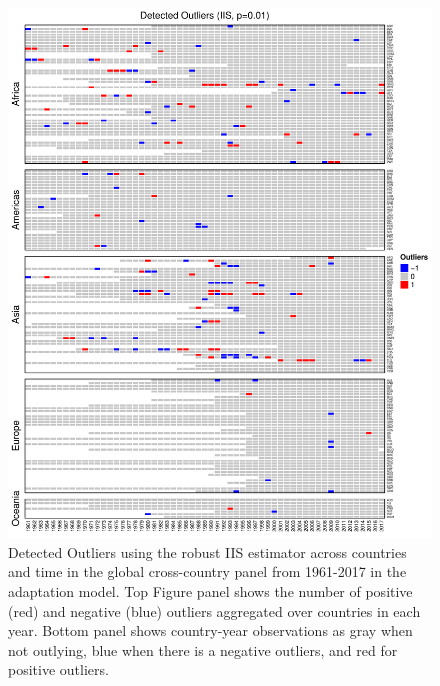 \documentclass[11pt, letterpaper]{article}
\numberwithin{algorithm}{section}
\numberwithin{assumption}{section}
\numberwithin{lemma}{section}
\numberwithin{theorem}{section}
\numberwithin{corollary}{section}
\numberwithin{remark}{section}
\numberwithin{equation}{section}
\numberwithin{figure}{section}
\numberwithin{table}{section}
\begin{document}
\begin{figure}[!htbp]  \vspace{-.35in}
\centering
\includegraphics[width = \textwidth]{heat1_adapt.pdf}
\caption{Detected Outliers using the robust IIS estimator across countries and time in the global cross-country panel from 1961-2017 in the adaptation model. Top Figure panel shows the number of positive (red) and negative (blue) outliers aggregated over countries in each year. Bottom panel shows country-year observations as gray when not outlying, blue when there is a negative outliers, and red for positive outliers.}
\label{fig_out_app1}
\end{figure}
\end{document}
